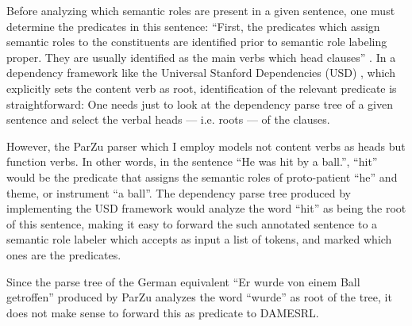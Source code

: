 Before analyzing which semantic roles are present in a given sentence, one
must determine the predicates in this sentence: ``First, the predicates which
assign semantic roles to the constituents are identified prior to semantic
role labeling proper. They are usually identified as the main verbs which
head clauses'' \citep[p.~74]{samardzic2013dynamics}. In a dependency framework
like the Universal Stanford Dependencies (USD) \citep{de2014universal},
which explicitly sets the content verb as root, identification of the
relevant predicate is straightforward: One needs just to look at the dependency
parse tree of a given sentence and select the verbal heads --- i.e. roots ---
of the clauses.

However, the ParZu parser \citep{sennrich2009new} which I employ models not content verbs
as heads but function verbs. In other words, in the sentence
``He was hit by a ball.'', ``hit'' would be the predicate that assigns the semantic roles of
proto-patient ``he'' and theme, or instrument ``a ball''. The dependency parse tree produced
by implementing the USD framework would analyze the word ``hit'' as being the root of this
sentence, making it easy to forward the such annotated sentence to a semantic role labeler
which accepts as input a list of tokens, and marked which ones are the predicates.


Since the parse tree of the German equivalent ``Er wurde von einem Ball getroffen'' produced
by ParZu analyzes the word ``wurde'' as root of the tree, it does not make sense
to forward this as predicate to DAMESRL.



